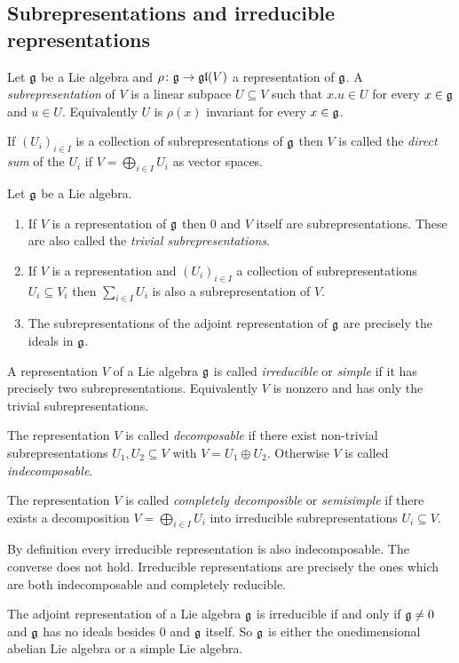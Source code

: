 \subsection{Subrepresentations and irreducible representations}


\begin{defi}
 Let $\mathfrak{g}$ be a Lie algebra and $\rho \colon \mathfrak{g} \to \mathfrak{gl}(V)$ a representation of $\mathfrak{g}$. A \emph{subrepresentation} of $V$ is a linear subpace $U \subseteq V$ such that $x.u \in U$ for every $x \in \mathfrak{g}$ and $u \in U$. Equivalently $U$ is $\rho(x)$ invariant for every $x \in \mathfrak{g}$.
 
 If $(U_i)_{i \in I}$ is a collection of subrepresentations of $\mathfrak{g}$ then $V$ is called the \emph{direct sum} of the $U_i$ if $V = \bigoplus_{i \in I} U_i$ as vector spaces.
\end{defi}


\begin{expls}
 Let $\mathfrak{g}$ be a Lie algebra.
 \begin{enumerate}[leftmargin=*]
  \item
   If $V$ is a representation of $\mathfrak{g}$ then $0$ and $V$ itself are subrepresentations. These are also called the \emph{trivial subrepresentations}.
  \item
   If $V$ is a representation and $(U_i)_{i \in I}$ a collection of subrepresentations $U_i \subseteq V_i$ then $\sum_{i \in I} U_i$ is also a subrepresentation of $V$.
  \item
   The subrepresentations of the adjoint representation of $\mathfrak{g}$ are precisely the ideals in $\mathfrak{g}$.
 \end{enumerate}
\end{expls}


\begin{defi}
 A representation $V$ of a Lie algebra $\mathfrak{g}$ is called \emph{irreducible} or \emph{simple} if it has precisely two subrepresentations. Equivalently $V$ is nonzero and has only the trivial subrepresentations.
 
 The representation $V$ is called \emph{decomposable} if there exist non-trivial subrepresentations $U_1, U_2 \subseteq V$ with $V = U_1 \oplus U_2$. Otherwise $V$ is called \emph{indecomposable}.
 
 The representation $V$ is called \emph{completely decomposible} or \emph{semisimple} if there exists a decomposition $V = \bigoplus_{i \in I} U_i$ into irreducible subrepresentations $U_i \subseteq V$.
\end{defi}


\begin{rem}
 By definition every irreducible representation is also indecomposable. The converse does not hold. Irreducible representations are precisely the ones which are both indecomposable and completely reducible.
\end{rem}


\begin{expl}
 The adjoint representation of a Lie algebra $\mathfrak{g}$ is irreducible if and only if $\mathfrak{g} \neq 0$ and $\mathfrak{g}$ has no ideals besides $0$ and $\mathfrak{g}$ itself. So $\mathfrak{g}$ is either the onedimensional abelian Lie algebra or a simple Lie algebra.
\end{expl}